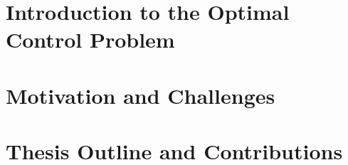 \section{Introduction to the Optimal Control Problem}

\section{Motivation and Challenges}

\section{Thesis Outline and Contributions}
